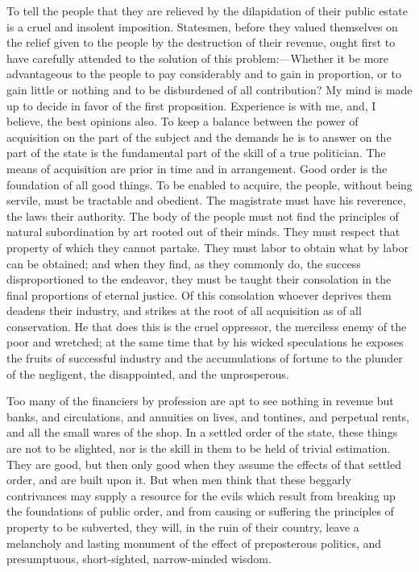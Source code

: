 To tell the people that they are relieved by the dilapidation of their public estate is a cruel and insolent imposition. Statesmen, before they valued themselves on the relief given to the people by the destruction of their revenue, ought first to have carefully attended to the solution of this problem:—Whether it be more advantageous to the people to pay considerably and to gain in proportion, or to gain little or nothing and to be disburdened of all contribution? My mind is made up to decide in favor of the first proposition. Experience is with me, and, I believe, the best opinions also. To keep a balance between the power of acquisition on the part of the subject and the demands he is to answer on the part of the state is the fundamental part of the skill of a true politician. The means of acquisition are prior in time and in arrangement. Good order is the foundation of all good things. To be enabled to acquire, the people, without being servile, must be tractable and obedient. The magistrate must have his reverence, the laws their authority. The body of the people must not find the principles of natural subordination by art rooted out of their minds. They must respect that property of which they cannot partake. They must labor to obtain what by labor can be obtained; and when they find, as they commonly do, the success disproportioned to the endeavor, they must be taught their consolation in the final proportions of eternal justice. Of this consolation whoever deprives them deadens their industry, and strikes at the root of all acquisition as of all conservation. He that does this is the cruel oppressor, the merciless enemy of the poor and wretched; at the same time that by his wicked speculations he exposes the fruits of successful industry and the accumulations of fortune to the plunder of the negligent, the disappointed, and the unprosperous.

Too many of the financiers by profession are apt to see nothing in revenue but banks, and circulations, and annuities on lives, and tontines, and perpetual rents, and all the small wares of the shop. In a settled order of the state, these things are not to be slighted, nor is the skill in them to be held of trivial estimation. They are good, but then only good when they assume the effects of that settled order, and are built upon it. But when men think that these beggarly contrivances may supply a resource for the evils which result from breaking up the foundations of public order, and from causing or suffering the principles of property to be subverted, they will, in the ruin of their country, leave a melancholy and lasting monument of the effect of preposterous politics, and presumptuous, short-sighted, narrow-minded wisdom.

